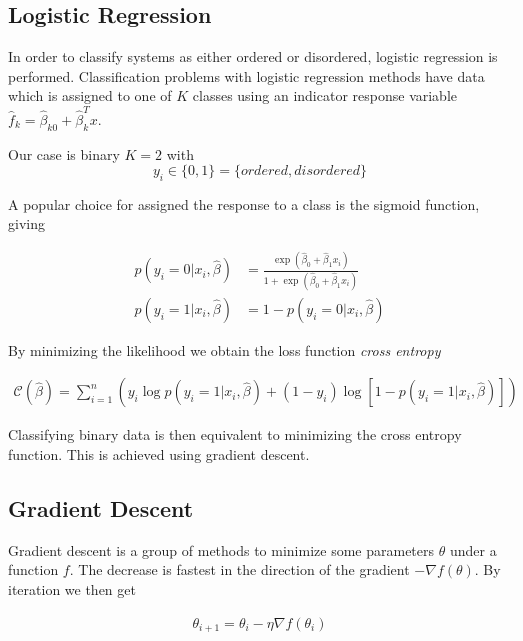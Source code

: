 \subsection{Logistic Regression}

In order to classify systems as either ordered or disordered, logistic
regression is performed. Classification problems with logistic regression methods have data which is assigned to
one of \(K\) classes using an indicator response variable \(\hat f_{k}= \hat
\beta_{k0} + \hat\beta_{k}^{T}x\). 

Our case is binary \(K=2\) with
\begin{equation*}
y_{i} \in \{0,1\} = \{ordered, disordered\}
\end{equation*}

A popular choice for assigned the response to a class is the sigmoid function, giving

\begin{align*}
  p(y_{i} = 0 | x_{i},\hat\beta)  &= \frac{\exp(\hat{\beta}_{0} + 
                                    \hat\beta_{1}x_{i})}{1 + \exp(\hat\beta_{0} + \hat\beta_{1}x_{i})}\\
  p(y_{i} = 1 | x_{i},\hat\beta) &= 1 - p(y_i = 0 | x_{i},\hat\beta)
\end{align*}

By minimizing the likelihood we obtain the loss function \textit{cross entropy}~\cite{statelem}

\begin{align*}
  \mathcal{C}(\hat\beta) = \sum_{i=1}^{n}\left( y_{i}\log{p(y_{i}=1|x_{i},\hat\beta)} +
  (1-y_{i})\log{\left[ 1-p(y_{i}=1|x_{i},\hat\beta) \right]}\right)
\end{align*}

Classifying binary data is then equivalent to minimizing the cross entropy
function. This is achieved using gradient descent.

\subsection{Gradient Descent}

Gradient descent is a group of methods to minimize some parameters \(\theta\)
under a function \(f\).
The decrease is fastest in the direction of the gradient \(-\nabla f(\theta)\). By
iteration we then get

\begin{align*}
  \theta_{i+1} = \theta_{i} - \eta\nabla f(\theta_{i})
\end{align*}

